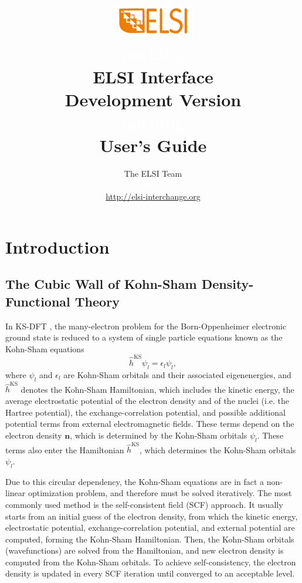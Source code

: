 \documentclass{report}
\begin{document}
\title{\includegraphics[scale=0.07]{elsi_logo.png}\\ \textcolor{white}{nothing}\\ \textbf{ELSI Interface\\ Development Version\\ \textcolor{white}{nothing} \\ User's Guide}}
\author{The ELSI Team\\ \textcolor{white}{nothing}\\ \url{http://elsi-interchange.org}}
\maketitle

\tableofcontents

\chapter{Introduction}
\section{The Cubic Wall of Kohn-Sham Density-Functional Theory}
\label{sec:ksdft}
In KS-DFT \cite{ks_kohn_1965}, the many-electron problem for the Born-Oppenheimer electronic ground state is reduced to a system of single particle equations known as the Kohn-Sham equations
\begin{equation}
\label{eq:ks}
\hat{h}^\text{KS} \psi_l = \epsilon_l \psi_l ,
\end{equation}
where $\psi_l$ and $\epsilon_l$ are Kohn-Sham orbitals and their associated eigenenergies, and $\hat{h}^\text{KS}$ denotes the Kohn-Sham Hamiltonian, which includes the kinetic energy, the average electrostatic potential of the electron density and of the nuclei (i.e. the Hartree potential), the exchange-correlation potential, and possible additional potential terms from external electromagnetic fields.  These terms depend on the electron density $\boldsymbol{n}$, which is determined by the Kohn-Sham orbitals $\psi_l$.  These terms also enter the Hamiltonian $\hat{h}^\text{KS}$, which determines the Kohn-Sham orbitals $\psi_l$.

Due to this circular dependency, the Kohn-Sham equations are in fact a non-linear optimization problem, and therefore must be solved iteratively.  The most commonly used method is the self-consistent field (SCF) approach.  It usually starts from an initial guess of the electron density, from which the kinetic energy, electrostatic potential, exchange-correlation potential, and external potential are computed, forming the Kohn-Sham Hamiltonian.  Then, the Kohn-Sham orbitals (wavefunctions) are solved from the Hamiltonian, and new electron density is computed from the Kohn-Sham orbitals.  To achieve self-consistency, the electron density is updated in every SCF iteration until converged to an acceptable level.
\end{document}
